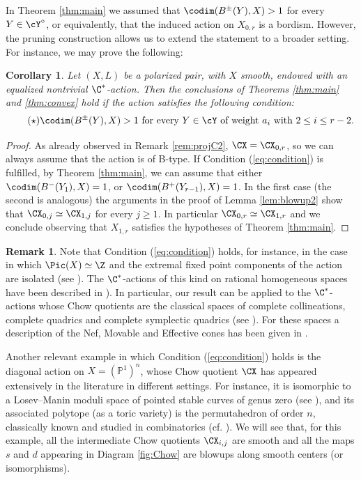 \documentclass[reqno]{amsproc}
\newtheorem{corollary}[theorem]{Corollary}
\theoremstyle{definition}
\newtheorem{remark}[theorem]{Remark}
\begin{document}
In Theorem \ref{thm:main} we assumed that  $\codim(B^\pm(Y),X)>1$ for every  $Y\in\cY^\circ$, or equivalently, that the induced action on $X_{0,r}$ is a bordism. However, the pruning construction allows us to extend the statement to a broader setting. For instance, we may prove the following:

\begin{corollary}\label{cor:main}
Let $(X,L)$ be a polarized pair, with $X$ smooth, endowed with an equalized nontrivial $\C^*$-action. Then the conclusions of Theorems \ref{thm:main} and \ref{thm:convex} hold if the action satisfies the following condition:
\begin{equation}\label{eq:condition}\tag{$\star$} 
\text{$\codim(B^\pm(Y),X)>1$ for every $Y\in \cY$ of weight $a_i$ with $2 \le i \le r-2$.}
\end{equation}
\end{corollary}
\begin{proof}
As already observed in Remark \ref{rem:projC2}, $\CX =\CX_{0,r}$, so we can always assume that the action is of B-type. 
If Condition (\ref{eq:condition}) is fulfilled, by Theorem \ref{thm:main}, we can assume that either $\codim(B^-(Y_1),X)=1$, or $\codim(B^+(Y_{r-1}),X)=1$.
In the first case (the second is analogous) the arguments in the proof of Lemma \ref{lem:blowup2} show that $\CX_{0,j} \simeq \CX_{1,j}$ for every $j \ge 1$. %
In particular $\CX_{0,r} \simeq \CX_{1,r}$ and we conclude observing that $X_{1,r}$ satisfies the hypotheses of Theorem \ref{thm:main}. 
\end{proof}

\begin{remark}\label{rem:isoextreme}
Note that Condition (\ref{eq:condition}) holds, for instance, in the case in which $\Pic(X) \simeq \Z$ and the extremal fixed point components of the action are isolated (see \cite[Lemma~2.8 (2)]{WORS1}). The $\C^*$-actions of this kind on rational homogeneous spaces have been described in \cite[Section~3.4]{WORS5}). In particular, our result can be applied to the $\C^*$-actions whose Chow quotients are the classical spaces of complete collineations, complete quadrics and complete symplectic quadrics (see \cite{Thaddeus}). For these spaces a description of the Nef, Movable and Effective cones has been given in \cite{Hue,Mas1,Mas3}.\end{remark}

Another relevant example in which Condition (\ref{eq:condition}) holds is the diagonal action on  $X=(\mathbb{P}^1)^n$, whose Chow quotient $\CX$ has appeared extensively in the literature in different settings. For instance, it is isomorphic to a Losev--Manin moduli space %
of pointed stable curves of genus zero (see \cite{LS}), and its associated polytope (as a toric variety) is the permutahedron of order $n$, classically known and studied in combinatorics (cf. \cite{post}). We will see that, for this example, all the intermediate Chow quotients $\CX_{i,j}$ are smooth and all the maps $s$ and $d$  appearing in Diagram \ref{fig:Chow} are blowups along smooth centers (or isomorphisms).
\end{document}
